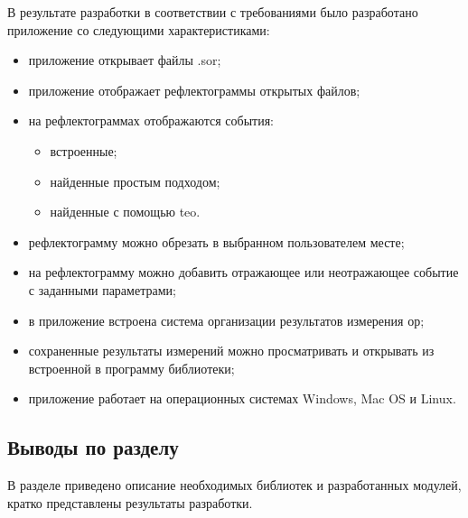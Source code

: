 В результате разработки в соответствии с требованиями было разработано приложение со следующими характеристиками:

\begin{itemize}
  \item приложение открывает файлы .sor;
  \item приложение отображает рефлектограммы открытых файлов;
  \item на рефлектограммах отображаются события:
  \begin{itemize}
    \item встроенные;
    \item найденные простым подходом;
    \item найденные с помощью \acrshort{teo}.
  \end{itemize}
  \item рефлектограмму можно обрезать в выбранном пользователем месте;
  \item на рефлектограмму можно добавить отражающее или неотражающее событие с заданными параметрами;
  \item в приложение встроена система организации результатов измерения \acrshort{ор};
  \item сохраненные результаты измерений можно просматривать и открывать из встроенной в программу библиотеки;
  \item приложение работает на операционных системах Windows, Mac OS и Linux.
\end{itemize}

\subsection{Выводы по разделу}

В разделе приведено описание необходимых библиотек и разработанных модулей, кратко представлены результаты разработки.
